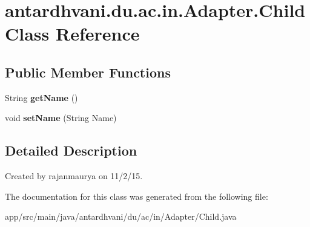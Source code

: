 \hypertarget{classantardhvani_1_1du_1_1ac_1_1in_1_1_adapter_1_1_child}{}\section{antardhvani.\+du.\+ac.\+in.\+Adapter.\+Child Class Reference}
\label{classantardhvani_1_1du_1_1ac_1_1in_1_1_adapter_1_1_child}
\subsection*{Public Member Functions}
\begin{DoxyCompactItemize}
\item 
\hypertarget{classantardhvani_1_1du_1_1ac_1_1in_1_1_adapter_1_1_child_a7fa11cae8fd7e17e18cbeeda0829b796}{}String {\bfseries get\+Name} ()\label{classantardhvani_1_1du_1_1ac_1_1in_1_1_adapter_1_1_child_a7fa11cae8fd7e17e18cbeeda0829b796}

\item 
\hypertarget{classantardhvani_1_1du_1_1ac_1_1in_1_1_adapter_1_1_child_a0efb9aced1245171c3a98f754337865a}{}void {\bfseries set\+Name} (String Name)\label{classantardhvani_1_1du_1_1ac_1_1in_1_1_adapter_1_1_child_a0efb9aced1245171c3a98f754337865a}

\end{DoxyCompactItemize}


\subsection{Detailed Description}
Created by rajanmaurya on 11/2/15. 

The documentation for this class was generated from the following file\+:\begin{DoxyCompactItemize}
\item 
app/src/main/java/antardhvani/du/ac/in/\+Adapter/Child.\+java\end{DoxyCompactItemize}
